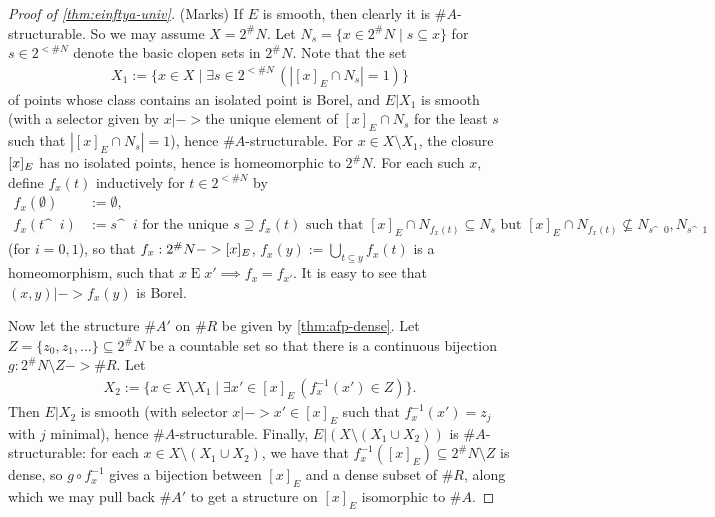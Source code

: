 \documentclass[11pt]{article}
\begin{document}
\begin{proof}[Proof of \cref{thm:einftya-univ}](Marks)
If $E$ is smooth, then clearly it is $\#A$-structurable.  So we may assume $X = 2^\#N$.  Let $N_s = \{x \in 2^\#N \mid s \subseteq x\}$ for $s \in 2^{<\#N}$ denote the basic clopen sets in $2^\#N$.  Note that the set
\begin{align*}
X_1 := \{x \in X \mid \exists s \in 2^{<\#N}\, (|[x]_E \cap N_s| = 1)\}
\end{align*}
of points whose class contains an isolated point is Borel, and $E|X_1$ is smooth (with a selector given by $x |->{}$the unique element of $[x]_E \cap N_s$ for the least $s$ such that $|[x]_E \cap N_s| = 1$), hence $\#A$-structurable.  For $x \in X \setminus X_1$, the closure $\-{[x]_E}$ has no isolated points, hence is homeomorphic to $2^\#N$.  For each such $x$, define $f_x(t)$ inductively for $t \in 2^{<\#N}$ by
\begin{align*}
f_x(\emptyset) &:= \emptyset, \\
f_x(t\^{\;\;}i) &:= \text{$s\^{\;\;}i$ for the unique $s \supseteq f_x(t)$ such that $[x]_E \cap N_{f_x(t)} \subseteq N_s$ but $[x]_E \cap N_{f_x(t)} \not\subseteq N_{s\^{\;\;}0}, N_{s\^{\;\;}1}$}
\end{align*}
(for $i = 0, 1$), so that $f_x : 2^\#N -> \-{[x]_E}$, $f_x(y) := \bigcup_{t \subseteq y} f_x(t)$ is a homeomorphism, such that $x \mathrel{E} x' \implies f_x = f_{x'}$.  It is easy to see that $(x, y) |-> f_x(y)$ is Borel.

Now let the structure $\#A'$ on $\#R$ be given by \cref{thm:afp-dense}.  Let $Z = \{z_0, z_1, \dotsc\} \subseteq 2^\#N$ be a countable set so that there is a continuous bijection $g : 2^\#N \setminus Z -> \#R$.  Let
\begin{align*}
X_2 := \{x \in X \setminus X_1 \mid \exists x' \in [x]_E\, (f_x^{-1}(x') \in Z)\}.
\end{align*}
Then $E|X_2$ is smooth (with selector $x |-> x' \in [x]_E$ such that $f_x^{-1}(x') = z_j$ with $j$ minimal), hence $\#A$-structurable.  Finally, $E|(X \setminus (X_1 \cup X_2))$ is $\#A$-structurable: for each $x \in X \setminus (X_1 \cup X_2)$, we have that $f_x^{-1}([x]_E) \subseteq 2^\#N \setminus Z$ is dense, so $g \circ f_x^{-1}$ gives a bijection between $[x]_E$ and a dense subset of $\#R$, along which we may pull back $\#A'$ to get a structure on $[x]_E$ isomorphic to $\#A$.
\end{proof}

\end{document}
